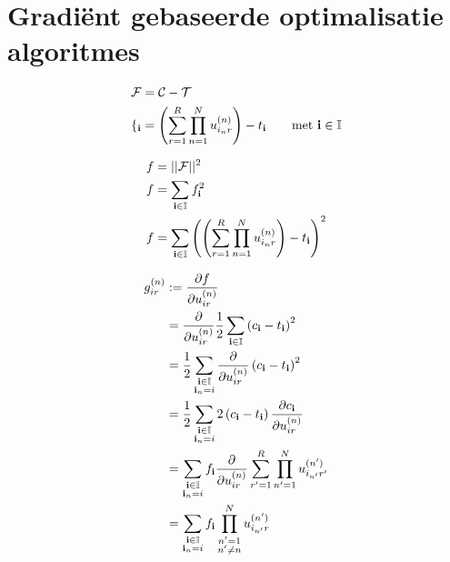 \section{Gradi\"ent gebaseerde optimalisatie algoritmes}
\label{h:algo} 

\begin{align*}
    \mathcal{F} &= \mathcal{C} - \mathcal{T}\\
    \mathcal{f_{\textbf{i}}} &= \left( \sum_{r=1}^{R} \prod_{n=1}^{N} u^{(n)}_{i_{n}r} \right) - t_{\textbf{i}} \qquad \text{met $\textbf{i} \in \mathbb{I}$}
\end{align*}

\begin{align*}
    f &= ||\mathcal{F}||^2\\
    f &= \sum_{\textbf{i} \in \mathbb{I}} f_{\textbf{i}}^2\\
    f &=  \sum_{\textbf{i} \in \mathbb{I}} \left( \left( \sum_{r=1}^{R} \prod_{n=1}^{N} u^{(n)}_{i_{n}r} \right) - t_{\textbf{i}} \right)^2 \\
\end{align*}

\begin{align*}
    g^{(n)}_{ir} 	&:= \frac{\partial f}{\partial u^{(n)}_{ir}}\\
					&=\frac{\partial}{\partial u^{(n)}_{ir}} \frac{1}{2}\sum_{\textbf{i} \in \mathbb{I}}\left(c_{\textbf{i}} - t_{\textbf{i}} \right)^2\\
					&= \frac{1}{2} \sum_{\substack{\textbf{i} \in \mathbb{I}\\ \textbf{i}_n = i}} \frac{\partial}{\partial u^{(n)}_{ir}} \left(c_{\textbf{i}} - t_{\textbf{i}} \right)^2\\
					&= \frac{1}{2} \sum_{\substack{\textbf{i} \in \mathbb{I}\\ \textbf{i}_n = i}} 2 \left(c_{\textbf{i}} - t_{\textbf{i}} \right) \frac{\partial c_{\textbf{i}}}{\partial u^{(n)}_{ir}}\\
					&=\sum_{\substack{\textbf{i} \in \mathbb{I}\\ \textbf{i}_n = i}} f_{\textbf{i}} \frac{\partial}{\partial u^{(n)}_{ir}} \sum_{r'=1}^{R} \prod_{n'=1}^{N} u^{(n')}_{i_{n'}r'}\\
					&=\sum_{\substack{\textbf{i} \in \mathbb{I}\\ \textbf{i}_n = i}} f_{\textbf{i}} \prod_{\substack{n'=1\\n'\neq n}}^{N} u^{(n')}_{i_{n'}r}\\
\end{align*}


